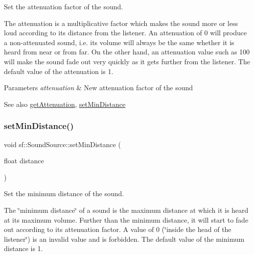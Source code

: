 Set the attenuation factor of the sound. 

The attenuation is a multiplicative factor which makes the sound more or less loud according to its distance from the listener. An attenuation of 0 will produce a non-\/attenuated sound, i.\+e. its volume will always be the same whether it is heard from near or from far. On the other hand, an attenuation value such as 100 will make the sound fade out very quickly as it gets further from the listener. The default value of the attenuation is 1.


\begin{DoxyParams}{Parameters}
{\em attenuation} & New attenuation factor of the sound\\
\hline
\end{DoxyParams}
\begin{DoxySeeAlso}{See also}
\mbox{\hyperlink{classsf_1_1_sound_source_a8ad7dafb4f1b4afbc638cebe24f48cc9}{get\+Attenuation}}, \mbox{\hyperlink{classsf_1_1_sound_source_a75bbc2c34addc8b25a14edb908508afe}{set\+Min\+Distance}} \begin{DoxyVerb}\end{DoxyVerb}
 
\end{DoxySeeAlso}
\mbox{\label{classsf_1_1_sound_source_a75bbc2c34addc8b25a14edb908508afe}} 
\subsubsection{\texorpdfstring{setMinDistance()}{setMinDistance()}}
{\footnotesize\ttfamily void sf\+::\+Sound\+Source\+::set\+Min\+Distance (\begin{DoxyParamCaption}\item[{float}]{distance }\end{DoxyParamCaption})}



Set the minimum distance of the sound. 

The \char`\"{}minimum distance\char`\"{} of a sound is the maximum distance at which it is heard at its maximum volume. Further than the minimum distance, it will start to fade out according to its attenuation factor. A value of 0 (\char`\"{}inside the head
of the listener\char`\"{}) is an invalid value and is forbidden. The default value of the minimum distance is 1.


